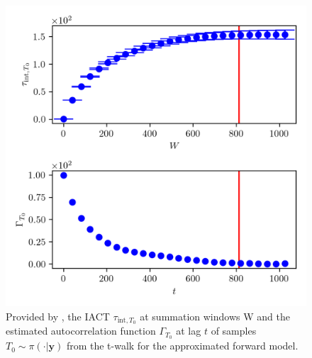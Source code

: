\begin{figure}[ht!]
	\centering
	\includegraphics{UwerrTauIntTWalk4.png}
	\caption[IACT and autocorrelation function of samples $T_0  \sim \pi(\cdot|\bm{y})$, for approximated model.]{Provided by \cite{drikHesse}, the IACT $\tau_{\text{int},T_0}$ at summation windows W and the estimated autocorrelation function $\Gamma_{T_0}$ at lag $t$ of samples $T_0 \sim \pi( \cdot| \bm{y})$ from the t-walk for the approximated forward model.}
	\label{fig:TWalkIATC5}
\end{figure}


